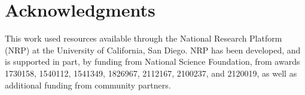 \section*{Acknowledgments}
This work used resources available through the National Research Platform (NRP) at the University of California, San Diego. NRP has been developed, and is supported in part, by funding from National Science Foundation, from awards 1730158, 1540112, 1541349, 1826967, 2112167, 2100237, and 2120019, as well as additional funding from community partners.
